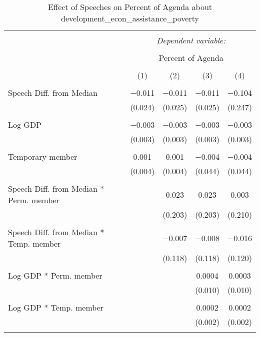 
\begin{table}[!htbp] \centering 
  \caption{Effect of Speeches on Percent of Agenda about development_econ_assistance_poverty} 
  \label{} 
\begin{tabular}{@{\extracolsep{5pt}}lcccc} 
\\[-1.8ex]\hline 
\hline \\[-1.8ex] 
 & \multicolumn{4}{c}{\textit{Dependent variable:}} \\ 
\cline{2-5} 
\\[-1.8ex] & \multicolumn{4}{c}{Percent of Agenda} \\ 
\\[-1.8ex] & (1) & (2) & (3) & (4)\\ 
\hline \\[-1.8ex] 
 Speech Diff. from Median & $-$0.011 & $-$0.011 & $-$0.011 & $-$0.104 \\ 
  & (0.024) & (0.025) & (0.025) & (0.247) \\ 
  & & & & \\ 
 Log GDP & $-$0.003 & $-$0.003 & $-$0.003 & $-$0.003 \\ 
  & (0.003) & (0.003) & (0.003) & (0.003) \\ 
  & & & & \\ 
 Temporary member & 0.001 & 0.001 & $-$0.004 & $-$0.004 \\ 
  & (0.004) & (0.004) & (0.044) & (0.044) \\ 
  & & & & \\ 
 Speech Diff. from Median * Perm. member &  & 0.023 & 0.023 & 0.003 \\ 
  &  & (0.203) & (0.203) & (0.210) \\ 
  & & & & \\ 
 Speech Diff. from Median * Temp. member &  & $-$0.007 & $-$0.008 & $-$0.016 \\ 
  &  & (0.118) & (0.118) & (0.120) \\ 
  & & & & \\ 
 Log GDP * Perm. member &  &  & 0.0004 & 0.0003 \\ 
  &  &  & (0.010) & (0.010) \\ 
  & & & & \\ 
 Log GDP * Temp. member &  &  & 0.0002 & 0.0002 \\ 
  &  &  & (0.002) & (0.002) \\ 
  & & & & \\ 

\end{tabular}
\end{table}
